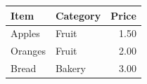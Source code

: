\documentclass{article}
\begin{document}
\begin{tabular}{llr}
\toprule
\textbf{Item} & \textbf{Category} & \textbf{Price} \\
\midrule
Apples & Fruit & 1.50 \\
Oranges & Fruit & 2.00 \\
Bread & Bakery & 3.00 \\
\bottomrule
\end{tabular}
\end{document}
